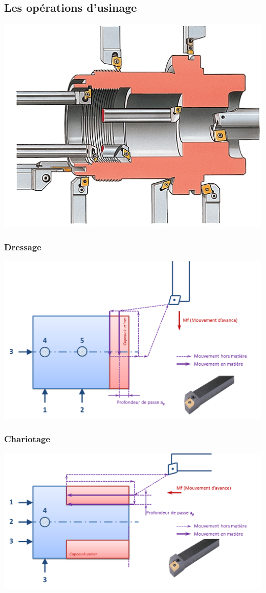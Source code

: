 \documentclass[11pt,oneside]{article}
\begin{document}
\subsection{Les opérations d'usinage}
\begin{center}
\includegraphics[width=.55\textwidth]{png/op_tournage}
\end{center}
\subsubsection{Dressage}
\begin{center}
\includegraphics[width=.7\textwidth]{png/op_dressage}
\end{center}
\subsubsection{Chariotage}
\begin{center}
\includegraphics[width=.7\textwidth]{png/op_chariotage}
\end{center}
\end{document}
